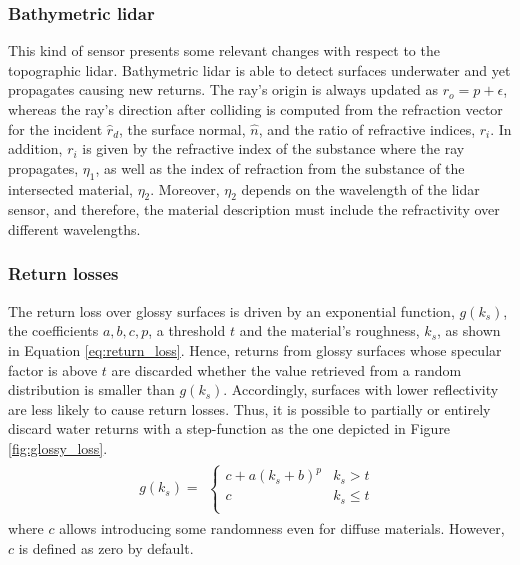 \subsubsection{Bathymetric \acrshort{lidar}}

This kind of sensor presents some relevant changes with respect to the topographic \acrshort{lidar}. Bathymetric \acrshort{lidar} is able to detect surfaces underwater and yet propagates causing new returns. The ray's origin is always updated as $r_{o} = p + \epsilon$, whereas the ray's direction after colliding is computed from the refraction vector for the incident $\hat{r}_{d}$, the surface normal, $\hat{n}$, and the ratio of refractive indices, $r_{i}$. In addition, $r_{i}$ is given by the refractive index of the substance where the ray propagates, $\eta_{1}$, as well as the index of refraction from the substance of the intersected material, $\eta_{2}$. Moreover, $\eta_{2}$ depends on the wavelength of the \acrshort{lidar} sensor, and therefore, the material description must include the refractivity over different wavelengths.

\subsubsection{Return losses}

The return loss over glossy surfaces is driven by an exponential function, $g(k_{s})$, the coefficients $a, b, c, p$, a threshold $\textit{t}$ and the material's roughness, $k_s$, as shown in Equation \ref{eq:return_loss}. Hence, returns from glossy surfaces whose specular factor is above $\textit{t}$ are discarded whether the value retrieved from a random distribution is smaller than $g(k_{s})$. Accordingly, surfaces with lower reflectivity are less likely to cause return losses. Thus, it is possible to partially or entirely discard water returns with a step-function as the one depicted in Figure \ref{fig:glossy_loss}. 
\begin{gather}
    \label{eq:return_loss}
    g(k_{s}) = \begin{aligned}
        \begin{cases}
            c + a (k_{s} + b) ^ {p} &k_{s} > \textit{t}\\
            c &k_{s} \leq \textit{t}\\
        \end{cases}
    \end{aligned}
\end{gather}
where $c$ allows introducing some randomness even for diffuse materials. However, $c$ is defined as zero by default.

